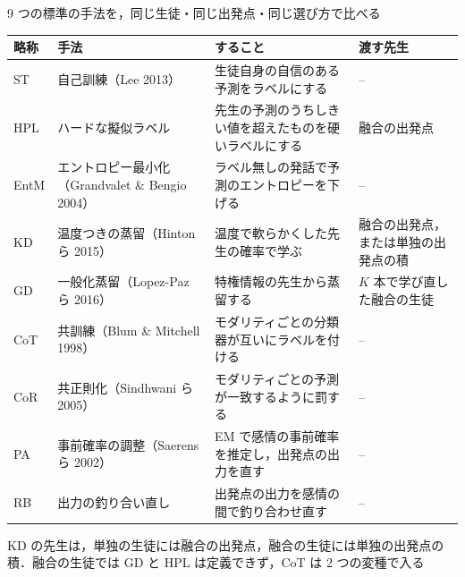 
\begin{frame}{9 つの標準の手法を，同じ生徒・同じ出発点・同じ選び方で比べる}
  \vspace{0.1em}
  \centering\tiny
  \renewcommand{\arraystretch}{1.15}
  \begin{tabularx}{\textwidth}{@{}p{0.8cm} p{4.4cm} X p{4.0cm}@{}}
    \toprule
    略称 & 手法 & すること & 渡す先生 \\
    \midrule
    ST & 自己訓練（Lee 2013） & 生徒自身の自信のある予測をラベルにする & -- \\
    HPL & ハードな擬似ラベル & 先生の予測のうちしきい値を超えたものを硬いラベルにする & 融合の出発点 \\
    EntM & エントロピー最小化（Grandvalet \& Bengio 2004） & ラベル無しの発話で予測のエントロピーを下げる & -- \\
    KD & 温度つきの蒸留（Hinton ら 2015） & 温度で軟らかくした先生の確率で学ぶ & 融合の出発点，または単独の出発点の積 \\
    GD & 一般化蒸留（Lopez-Paz ら 2016） & 特権情報の先生から蒸留する & $K$ 本で学び直した融合の生徒 \\
    CoT & 共訓練（Blum \& Mitchell 1998） & モダリティごとの分類器が互いにラベルを付ける & -- \\
    CoR & 共正則化（Sindhwani ら 2005） & モダリティごとの予測が一致するように罰する & -- \\
    PA & 事前確率の調整（Saerens ら 2002） & EM で感情の事前確率を推定し，出発点の出力を直す & -- \\
    RB & 出力の釣り合い直し & 出発点の出力を感情の間で釣り合わせ直す & -- \\
    \bottomrule
  \end{tabularx}\par
  \vspace{0.3em}
  {\raggedright\tiny KD の先生は，単独の生徒には融合の出発点，融合の生徒には単独の出発点の積．融合の生徒では GD と HPL は定義できず，CoT は 2 つの変種で入る\par}
  \vspace{0.2em}
\end{frame}


